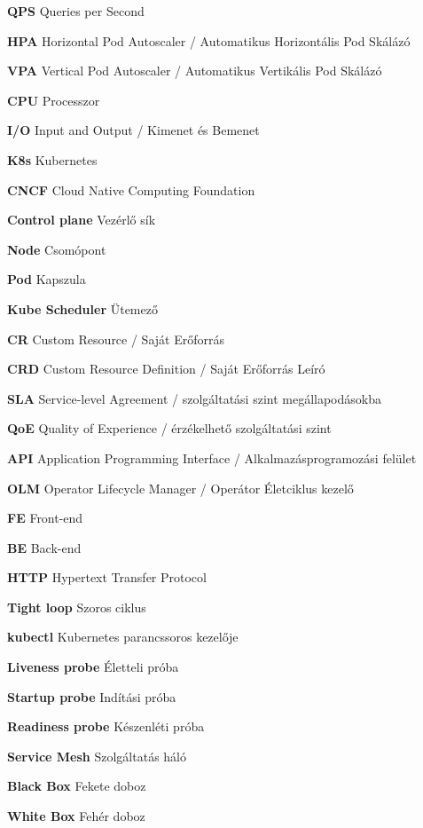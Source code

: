\begin{multicols}{2}
\textbf{QPS} Queries per Second 

\textbf{HPA} Horizontal Pod Autoscaler / Automatikus Horizontális Pod Skálázó 

\textbf{VPA} Vertical Pod Autoscaler / Automatikus Vertikális Pod Skálázó 

\textbf{CPU} Processzor 

\textbf{I/O} Input and Output / Kimenet és Bemenet 

\textbf{K8s} Kubernetes 

\textbf{CNCF} Cloud Native Computing Foundation 

\textbf{Control plane} Vezérlő sík 

\textbf{Node} Csomópont 

\textbf{Pod} Kapszula 

\textbf{Kube Scheduler} Ütemező 

\textbf{CR} Custom Resource / Saját Erőforrás 

\textbf{CRD} Custom Resource Definition / Saját Erőforrás Leíró

\textbf{SLA} Service-level Agreement / szolgáltatási szint megállapodásokba

\textbf{QoE} Quality of Experience / érzékelhető szolgáltatási szint

\columnbreak

\textbf{API} Application Programming Interface / Alkalmazásprogramozási felület 

\textbf{OLM} Operator Lifecycle Manager / Operátor Életciklus kezelő 

\textbf{FE} Front-end 

\textbf{BE} Back-end 

\textbf{HTTP} Hypertext Transfer Protocol 

\textbf{Tight loop} Szoros ciklus 

\textbf{kubectl} Kubernetes parancssoros kezelője 

\textbf{Liveness probe} Életteli próba 

\textbf{Startup probe} Indítási próba 

\textbf{Readiness probe} Készenléti próba 

\textbf{Service Mesh} Szolgáltatás háló

\textbf{Black Box} Fekete doboz

\textbf{White Box} Fehér doboz


\end{multicols}

